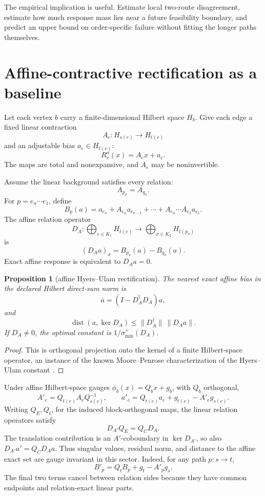 \documentclass[11pt]{article}
\newtheorem{proposition}[theorem]{Proposition}
\theoremstyle{definition}
\theoremstyle{remark}
\newcommand{\dist}{\operatorname{dist}}
\begin{document}
The empirical implication is useful. Estimate local two-route disagreement,
estimate how much response mass lies near a future feasibility boundary, and
predict an upper bound on order-specific failure without fitting the longer
paths themselves.

\section{Affine-contractive rectification as a baseline}
\label{sec:rectification}

Let each vertex \(b\) carry a finite-dimensional Hilbert space \(H_b\). Give
each edge a fixed linear contraction
\[
A_e:H_{s(e)}\to H_{t(e)}
\]
and an adjustable bias \(a_e\in H_{t(e)}\):
\[
R_e^a(x)=A_ex+a_e.
\]
The maps are total and nonexpansive, and \(A_e\) may be noninvertible.

Assume the linear background satisfies every relation:
\[
A_{p_\sigma}=A_{q_\sigma}.
\]
For \(p=e_n\cdots e_1\), define
\[
B_p(a)=a_{e_n}+A_{e_n}a_{e_{n-1}}+\cdots+
A_{e_n}\cdots A_{e_2}a_{e_1}.
\]
The affine relation operator
\[
D_A:\bigoplus_{e\in K_1}H_{t(e)}
\longrightarrow
\bigoplus_{\sigma\in K_2}H_{t(p_\sigma)}
\]
is
\[
(D_Aa)_\sigma=B_{p_\sigma}(a)-B_{q_\sigma}(a).
\]
Exact affine response is equivalent to \(D_Aa=0\).

\begin{proposition}[affine Hyers--Ulam rectification]
\label{prop:hu}
The nearest exact affine bias in the declared Hilbert direct-sum norm is
\[
\bar a=(I-D_A^\dagger D_A)a,
\]
and
\[
\dist(a,\ker D_A)
\le\|D_A^\dagger\|\,\|D_Aa\|.
\]
If \(D_A\ne0\), the optimal constant is
\(1/\sigma_{\min}^+(D_A)\).
\end{proposition}

\begin{proof}
This is orthogonal projection onto the kernel of a finite Hilbert-space
operator, an instance of the known Moore--Penrose characterization of the
Hyers--Ulam constant \citep{huang2012}.
\end{proof}

Under affine Hilbert-space gauges
\(\phi_b(x)=Q_bx+g_b\), with \(Q_b\) orthogonal,
\[
A'_e=Q_{t(e)}A_eQ_{s(e)}^{-1},
\qquad
a'_e=Q_{t(e)}a_e+g_{t(e)}-A'_eg_{s(e)}.
\]
Writing \(Q_E,Q_C\) for the induced block-orthogonal maps, the linear
relation operators satisfy
\[
D_{A'}Q_E=Q_CD_A.
\]
The translation contribution is an \(A'\)-coboundary in
\(\ker D_{A'}\), so also \(D_{A'}a'=Q_CD_Aa\). Thus singular values,
residual norm, and distance to the affine exact set are gauge invariant in
this sector. Indeed, for any path \(p:s\to t\),
\[
B'_p=Q_tB_p+g_t-A'_pg_s.
\]
The final two terms cancel between relation sides because they have common
endpoints and relation-exact linear parts.
\end{document}
